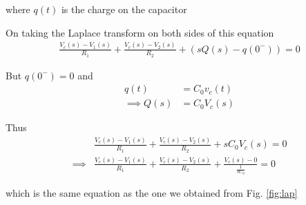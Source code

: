 \documentclass[journal,12pt,twocolumn]{IEEEtran}
\providecommand{\brak}[1]{\ensuremath{\left(#1\right)}}
\numberwithin{equation}{section}
\numberwithin{figure}{section}
\renewcommand\thesection{\arabic{section}}
\begin{document}
\begin{enumerate}[label=\thesection.\arabic*,ref=\thesection.\theenumi]
			where $q(t)$ is the charge on the capacitor
	
			On taking the Laplace transform on both sides of this equation
			\begin{align}
				\frac{V_c(s) - V_1(s)}{R_1} + \frac{V_c(s) - V_2(s)}{R_2} + \brak{sQ(s) - q(0^-)} = 0
			\end{align}
	
			But $q(0^-) = 0$ and 
			\begin{align}
				q(t) &= C_0v_c(t) \\
				\implies Q(s) &= C_0V_c(s)
			\end{align}
	
			Thus
			\begin{align}
				&\frac{V_c(s) - V_1(s)}{R_1} + \frac{V_c(s) - V_2(s)}{R_2} + sC_0V_c(s) = 0 \\
				\implies &\frac{V_c(s) - V_1(s)}{R_1} + 	\frac{V_c(s) - V_2(s)}{R_2} + \frac{V_c(s) - 0}{\frac{1}{sC_0}} = 0 
			\end{align}
	
			which is the same equation as the one we obtained from Fig. \ref{fig:lap}			
	\end{enumerate}
\end{document}
